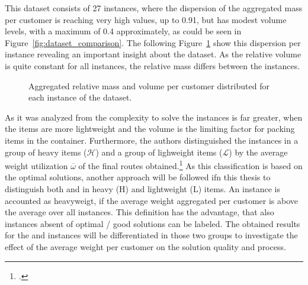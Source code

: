 This dataset consists of 27 instances, where the dispersion of the aggregated mass per customer is reaching very high values, up to
0.91, but has modest volume levels, with a maximum of 0.4 approximately, as could be seen in Figure~\ref{fig:dataset_comparison}. The
following Figure~\ref{fig:aggregated_gendreau_plots} show this dispersion per instance revealing an important insight about the dataset.
As the relative volume is quite constant for all instances, the relative mass differs between the instances.
\begin{figure}[ht]
    \centering
    \caption{Aggregated relative mass and volume per customer distributed for each instance of the \gendreauDataSetText dataset.}
    \label{fig:aggregated_gendreau_plots}
\end{figure}
As it was analyzed from \cite{tamke_branch-and-cut_2024}
the complexity to solve the instances is far greater, when the items are more lightweight and the volume is the limiting factor
for packing items in the container. Furthermore, the authors distinguished the instances in a
group of heavy items ($\mathcal{H}$) and a group of lighweight items ($\mathcal{L}$) by the average weight utilization $\overline{\omega}$
of the final routes obtained.\footcite[cf.][pp. 23-25]{tamke_branch-and-cut_2024}
As this classification is based on the optimal solutions, another approach will be followed ifn this thesis to distinguish both
\krebsADataSetText and \gendreauDataSetText in heavy (H) and lightweight (L) items. An instance is accounted as heavyweigt, if
the average weight aggregated per customer is above the average over all instances. This definition has the advantage, that also instances absent
of optimal / good solutions can be labeled. The obtained results for the \gendreauDataSetText and \krebsADataSetText instances will be
differentiated in those two groups to investigate the effect of the average weight per customer on the solution quality and process.


